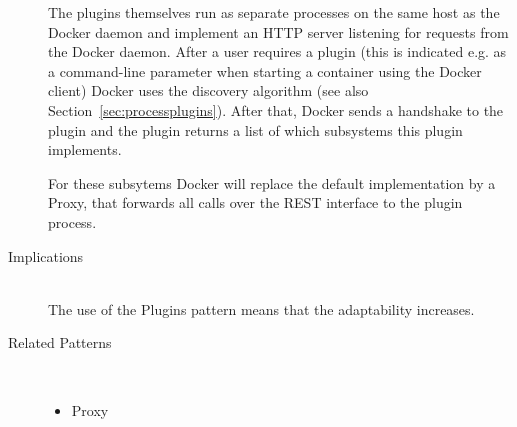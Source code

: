\begin{description}
The plugins themselves run as separate processes on the same host as the Docker daemon and implement an HTTP server listening for requests from the Docker daemon. After a user requires a plugin (this is indicated e.g. as a command-line parameter when starting a container using the Docker client) Docker uses the discovery algorithm (see also Section~\ref{sec:processplugins}). After that, Docker sends a handshake to the plugin and the plugin returns a list of which subsystems this plugin implements.


For these subsytems Docker will replace the default implementation by a Proxy, that forwards all calls over the REST interface to the plugin process.

\item [Implications]~\\
The use of the Plugins pattern means that the adaptability increases. 

\item [Related Patterns]~
\begin{itemize}
\item Proxy
\end{itemize}
\end{description}

